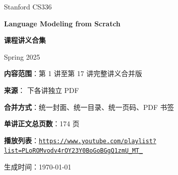 \documentclass[a4paper]{article}
\newcommand{\pageoverlay}{%
  \thispagestyle{empty}%
  \begin{tikzpicture}[remember picture,overlay]
    \fill[white] ($(current page.south west)+(0,0)$) rectangle ($(current page.south east)+(0,0.95cm)$);
    \draw[black!20,line width=0.3pt] ($(current page.south west)+(1.8cm,0.95cm)$) -- ($(current page.south east)+(-1.8cm,0.95cm)$);
    \node[anchor=south,font=\small] at ($(current page.south)+(0,0.20cm)$) {\thepage};
  \end{tikzpicture}%
}
\newcommand{\lectureentry}[2]{%
  \pageoverlay
  \phantomsection
  \addcontentsline{toc}{section}{#2}
}
\begin{document}
\begin{titlepage}
\thispagestyle{empty}
\centering
\vspace*{2.6cm}
{\Large Stanford CS336\par}
\vspace{0.4cm}
{\huge\bfseries Language Modeling from Scratch\par}
\vspace{0.5cm}
{\Huge\bfseries 课程讲义合集\par}
\vspace{1.2cm}
{\large Spring 2025\par}
\vspace{1.8cm}

\begin{tcolorbox}[width=0.9\textwidth,colback=blue!4!white,colframe=blue!45!black,sharp corners]
\textbf{内容范围}：第 1 讲至第 17 讲完整讲义合并版\par
\textbf{来源}：\texttt{} 下各讲独立 PDF\par
\textbf{合并方式}：统一封面、统一目录、统一页码、PDF 书签\par
\textbf{单讲正文总页数}：174 页\par
\textbf{播放列表}：\href{https://www.youtube.com/playlist?list=PLoROMvodv4rOY23Y0BoGoBGgQ1zmU_MT_}{\nolinkurl{https://www.youtube.com/playlist?list=PLoROMvodv4rOY23Y0BoGoBGgQ1zmU_MT_}}
\end{tcolorbox}

\vfill
{\large 生成时间：\today\par}
\end{titlepage}

\setcounter{page}{1}
\tableofcontents
\clearpage









\end{document}

